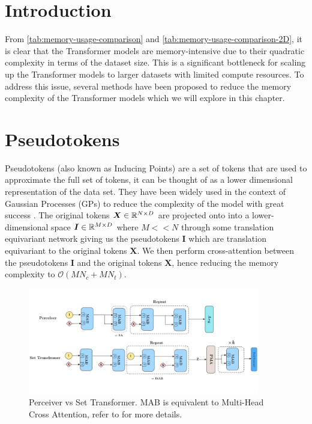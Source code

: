 \documentclass[../../main.tex]{subfiles}
\begin{document}
\section{Introduction}


From \autoref{tab:memory-usage-comparison} and \autoref{tab:memory-usage-comparison-2D}, it is clear that the Transformer models are memory-intensive due to their quadratic complexity in terms of the dataset size. This is a significant bottleneck for scaling up the Transformer models to larger datasets with limited compute resources. To address this issue, several methods have been proposed to reduce the memory complexity of the Transformer models which we will explore in this chapter.

\section{Pseudotokens}

Pseudotokens (also known as Inducing Points) are a set of tokens that are used to approximate the full set of tokens, it can be thought of as a lower dimensional representation of the data set. They have been widely used in the context of Gaussian Processes (GPs) to reduce the complexity of the model with great success \parencite{hensman2013gaussian}. The original tokens $\bm{X} \in \mathbb{R}^{N \times D}$ are projected onto into a lower-dimensional space $\bm{I} \in \mathbb{R}^{M \times D}$ where $M << N$ through some translation equivariant network \parencite{anonymous2024translationequivariant} giving us the pseudotokens $\bm{I}$ which are translation equivariant to the original tokens $\bm{X}$. We then perform cross-attention between the pseudotokens $\bm{I}$ and the original tokens $\bm{X}$, hence reducing the memory complexity to $\mathcal{O}(MN_c + MN_t)$. 



\begin{figure}[H]
    \centering
    \includegraphics[width=0.9\textwidth]{fig/set-transformer.png}
    \caption{Perceiver vs Set Transformer. MAB is equivalent to Multi-Head Cross Attention, refer to \parencite{jaegle2021perceiver, lee2019set} for more details.}
    \label{fig:set-transformer}
\end{figure}
\end{document}
